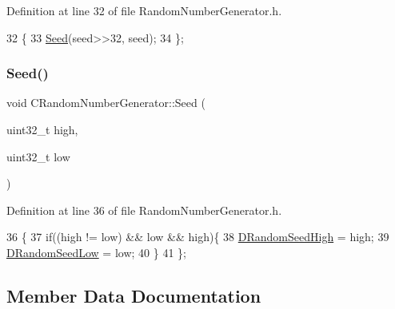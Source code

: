 Definition at line 32 of file Random\+Number\+Generator.\+h.


\begin{DoxyCode}
32                                 \{
33             \hyperlink{classCRandomNumberGenerator_a9b6f52335ea93f1aaec4521c66806f39}{Seed}(seed>>32, seed);
34         \};
\end{DoxyCode}
\hypertarget{classCRandomNumberGenerator_a2d7da1eb7f5886a113b0617276740f07}{}\label{classCRandomNumberGenerator_a2d7da1eb7f5886a113b0617276740f07} 
\subsubsection{\texorpdfstring{Seed()}{Seed()}\hspace{0.1cm}{\footnotesize\ttfamily [2/2]}}
{\footnotesize\ttfamily void C\+Random\+Number\+Generator\+::\+Seed (\begin{DoxyParamCaption}\item[{uint32\+\_\+t}]{high,  }\item[{uint32\+\_\+t}]{low }\end{DoxyParamCaption})\hspace{0.3cm}{\ttfamily [inline]}}



Definition at line 36 of file Random\+Number\+Generator.\+h.


\begin{DoxyCode}
36                                               \{
37             \textcolor{keywordflow}{if}((high != low) && low && high)\{
38                 \hyperlink{classCRandomNumberGenerator_a450670f954d6ccb3cc39d7eebbf889c6}{DRandomSeedHigh} = high;
39                 \hyperlink{classCRandomNumberGenerator_a33bf3bb9bc1378f4142932a01a3e2cfd}{DRandomSeedLow} = low;   
40             \}
41         \};
\end{DoxyCode}


\subsection{Member Data Documentation}
\hypertarget{classCRandomNumberGenerator_a450670f954d6ccb3cc39d7eebbf889c6}{}\label{classCRandomNumberGenerator_a450670f954d6ccb3cc39d7eebbf889c6} 
